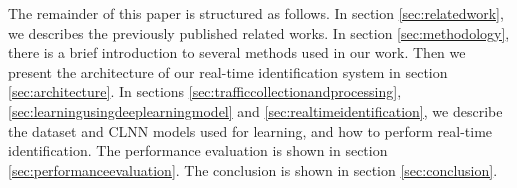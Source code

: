 \documentclass[conference]{IEEEtran}
\begin{document}
The remainder of this paper is structured as follows. In section \ref{sec:relatedwork}, we describes the previously published related works.  In section \ref{sec:methodology}, there is a brief introduction to several methods used in our work. Then we present the architecture of our real-time identification system in section \ref{sec:architecture}. In sections \ref{sec:trafficcollectionandprocessing}, \ref{sec:learningusingdeeplearningmodel} and \ref{sec:realtimeidentification}, we describe the dataset and CLNN models used for learning, and how to perform real-time identification. The performance evaluation is shown in section \ref{sec:performanceevaluation}. The conclusion is shown in section \ref{sec:conclusion}.






\end{document}

